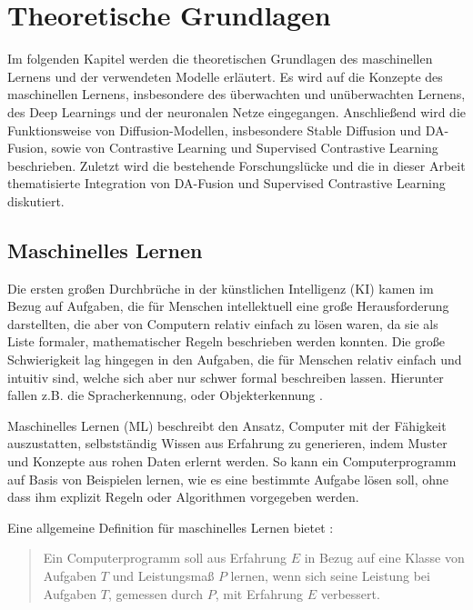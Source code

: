 \chapter{Theoretische Grundlagen}

Im folgenden Kapitel werden die theoretischen Grundlagen des maschinellen Lernens und der verwendeten Modelle erläutert. Es wird auf die Konzepte des maschinellen Lernens, insbesondere des überwachten und unüberwachten Lernens, des Deep Learnings und der neuronalen Netze eingegangen. Anschließend wird die Funktionsweise von Diffusion-Modellen, insbesondere Stable Diffusion und DA-Fusion, sowie von Contrastive Learning und Supervised Contrastive Learning beschrieben. Zuletzt wird die bestehende Forschungslücke und die in dieser Arbeit thematisierte Integration von DA-Fusion und Supervised Contrastive Learning diskutiert.

\section{Maschinelles Lernen} \label{sec:ml}

Die ersten großen Durchbrüche in der künstlichen Intelligenz (KI) kamen im Bezug auf Aufgaben, die für Menschen intellektuell eine große Herausforderung darstellten, die aber von Computern relativ einfach zu lösen waren, da sie als Liste formaler, mathematischer Regeln beschrieben werden konnten. Die große Schwierigkeit lag hingegen in den Aufgaben, die für Menschen relativ einfach und intuitiv sind, welche sich aber nur schwer formal beschreiben lassen. Hierunter fallen z.B. die Spracherkennung, oder Objekterkennung \parencite{Goodfellow2016deeplearning}.

Maschinelles Lernen (ML) beschreibt den Ansatz, Computer mit der Fähigkeit auszustatten, selbstständig Wissen aus Erfahrung zu generieren, indem Muster und Konzepte aus rohen Daten erlernt werden. So kann ein Computerprogramm auf Basis von Beispielen lernen, wie es eine bestimmte Aufgabe lösen soll, ohne dass ihm explizit Regeln oder Algorithmen vorgegeben werden.

Eine allgemeine Definition für maschinelles Lernen bietet \parencite{Mitchell1997machinelearning}:

\begin{quote}
Ein Computerprogramm soll aus Erfahrung $E$ in Bezug auf eine Klasse von Aufgaben $T$ und Leistungsmaß $P$ lernen, wenn sich seine Leistung bei Aufgaben $T$, gemessen durch $P$, mit Erfahrung $E$ verbessert.
\end{quote}

